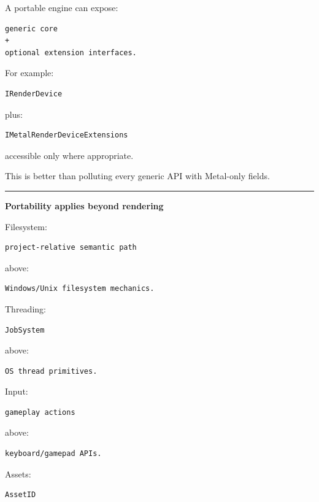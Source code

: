 A portable engine can expose:

\begin{verbatim}
generic core
+
optional extension interfaces.
\end{verbatim}

For example:

\begin{verbatim}
IRenderDevice
\end{verbatim}

plus:

\begin{verbatim}
IMetalRenderDeviceExtensions
\end{verbatim}

accessible only where appropriate.

This is better than polluting every generic API with Metal-only fields.

\begin{center}\rule{0.5\linewidth}{0.5pt}\end{center}

\textbf{Portability applies beyond rendering}

Filesystem:

\begin{verbatim}
project-relative semantic path
\end{verbatim}

above:

\begin{verbatim}
Windows/Unix filesystem mechanics.
\end{verbatim}

Threading:

\begin{verbatim}
JobSystem
\end{verbatim}

above:

\begin{verbatim}
OS thread primitives.
\end{verbatim}

Input:

\begin{verbatim}
gameplay actions
\end{verbatim}

above:

\begin{verbatim}
keyboard/gamepad APIs.
\end{verbatim}

Assets:

\begin{verbatim}
AssetID
\end{verbatim}

